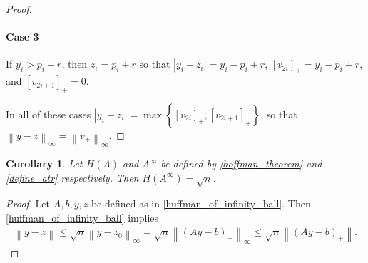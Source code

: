 \documentclass{article}
\newtheorem{corollary}[theorem]{Corollary}
\theoremstyle{case}
\numberwithin{theorem}{subsection}
\newcommand{\atr}{A^{\infty}}
\begin{document}
\begin{proof}
\paragraph{Case 3}
If $y_i > p_i + r              $, then $z_i = p_i + r$ so that $\left|y_i - z_i\right| = y_i - p_i + r$, $\left[v_{2i}\right]_+ = y_i - p_i + r$, and $\left[v_{2i+1}\right]_+ = 0$.

In all of these cases $\left|y_i - z_i\right| = \max\left\{\left[v_{2i}\right]_+, \left[v_{2i+1}\right]_+\right\}$,
so that $\left\|y - z\right\|_{\infty} = \left\| v_+ \right\|_{\infty}$.


\end{proof}

\begin{corollary}
Let $H(A)$ and $\atr$ be defined by \cref{hoffman_theorem} and \cref{define_atr} respectively.
Then $H(\atr) = \sqrt{n}$.
\end{corollary}
\begin{proof}
Let $A, b, y, z$ be defined as in \cref{huffman_of_infinity_ball}.
Then \cref{huffman_of_infinity_ball} implies
\begin{align*}
\left\|y - z\right\|
\le \sqrt{n} \left\|y - z_0\right\|_{\infty}
= \sqrt{n} \left\|\left(Ay - b\right)_+\right\|_{\infty}
\le \sqrt{n} \left\|\left(Ay - b\right)_+\right\|.
\end{align*}
\end{proof}
\end{document}
